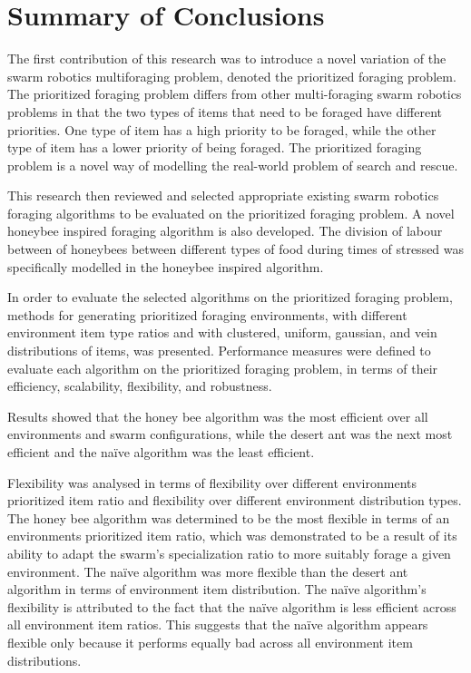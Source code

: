 \section{Summary of Conclusions}
\label{sec:conclusions:conclusion_summary}

The first contribution of this research was to introduce a novel variation of the swarm robotics multiforaging problem, denoted the prioritized foraging problem. The prioritized foraging problem differs from other multi-foraging swarm robotics problems in that the two types of items that need to be foraged have different priorities. One type of item has a high priority to be foraged, while the other type of item has a lower priority of being foraged. The prioritized foraging problem is a novel way of modelling the real-world problem of search and rescue.  

This research then reviewed and selected appropriate existing swarm robotics foraging algorithms to be evaluated on the prioritized foraging problem. A novel honeybee inspired foraging algorithm is also developed. The division of labour between of honeybees between different types of food during times of stressed was specifically modelled in the honeybee inspired algorithm.

In order to evaluate the selected algorithms on the prioritized foraging problem, methods for generating prioritized foraging environments, with different environment item type ratios and with clustered, uniform, gaussian, and vein distributions of items, was presented. Performance measures were defined to evaluate each algorithm on the prioritized foraging problem, in terms of their efficiency, scalability, flexibility, and robustness. 

Results showed that the honey bee algorithm was the most efficient over all environments and swarm configurations, while the desert ant was the next most efficient and the na\"ive algorithm was the least efficient.

Flexibility was analysed in terms of flexibility over different environments prioritized item ratio and flexibility over different environment distribution types. The honey bee algorithm was determined to be the most flexible in terms of an environments prioritized item ratio, which was demonstrated to be a result of its ability to adapt the swarm's specialization ratio to more suitably forage a given environment. The na\"ive algorithm was more flexible than the desert ant algorithm in terms of environment item distribution. The na\"ive algorithm's flexibility is attributed to the fact that the na\"ive algorithm is less efficient across all environment item ratios. This suggests that the na\"ive algorithm appears flexible only because it performs equally bad across all environment item distributions.

